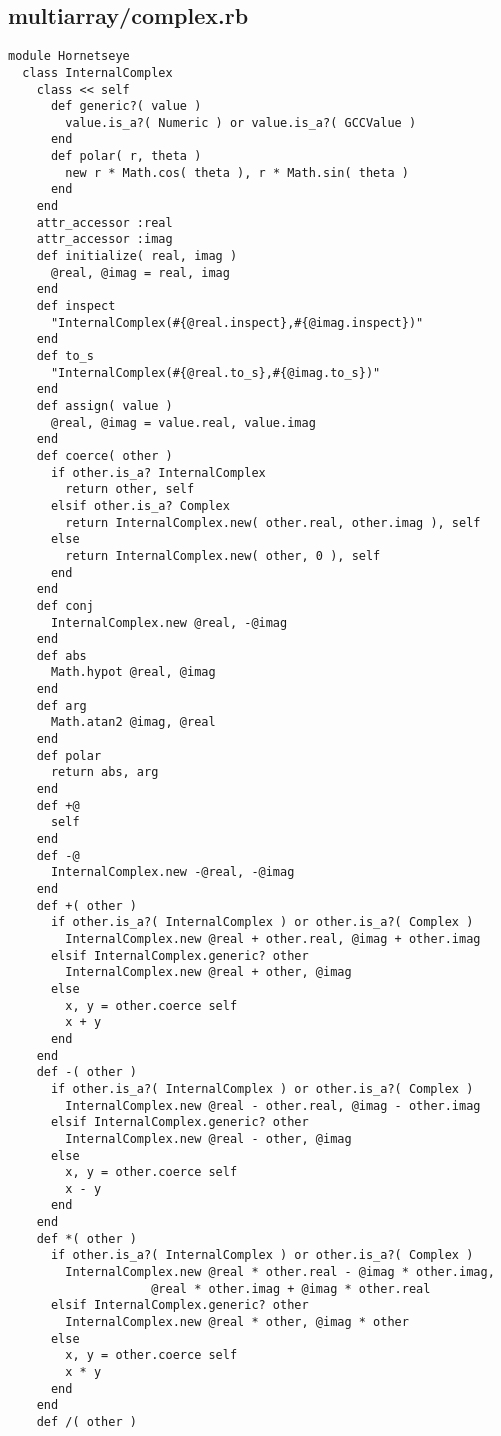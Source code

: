 \subsection{multiarray/complex.rb}\label{cha:multiarray-complex-rb}
\begin{lstlisting}
module Hornetseye
  class InternalComplex
    class << self
      def generic?( value )
        value.is_a?( Numeric ) or value.is_a?( GCCValue )
      end
      def polar( r, theta )
        new r * Math.cos( theta ), r * Math.sin( theta )
      end
    end
    attr_accessor :real
    attr_accessor :imag
    def initialize( real, imag )
      @real, @imag = real, imag
    end
    def inspect
      "InternalComplex(#{@real.inspect},#{@imag.inspect})"
    end
    def to_s
      "InternalComplex(#{@real.to_s},#{@imag.to_s})"
    end
    def assign( value )
      @real, @imag = value.real, value.imag
    end
    def coerce( other )
      if other.is_a? InternalComplex
        return other, self
      elsif other.is_a? Complex
        return InternalComplex.new( other.real, other.imag ), self
      else
        return InternalComplex.new( other, 0 ), self
      end
    end
    def conj
      InternalComplex.new @real, -@imag
    end
    def abs
      Math.hypot @real, @imag
    end
    def arg
      Math.atan2 @imag, @real
    end
    def polar
      return abs, arg
    end
    def +@
      self
    end
    def -@
      InternalComplex.new -@real, -@imag
    end
    def +( other )
      if other.is_a?( InternalComplex ) or other.is_a?( Complex )
        InternalComplex.new @real + other.real, @imag + other.imag
      elsif InternalComplex.generic? other
        InternalComplex.new @real + other, @imag
      else
        x, y = other.coerce self
        x + y
      end
    end
    def -( other )
      if other.is_a?( InternalComplex ) or other.is_a?( Complex )
        InternalComplex.new @real - other.real, @imag - other.imag
      elsif InternalComplex.generic? other
        InternalComplex.new @real - other, @imag
      else
        x, y = other.coerce self
        x - y
      end
    end
    def *( other )
      if other.is_a?( InternalComplex ) or other.is_a?( Complex )
        InternalComplex.new @real * other.real - @imag * other.imag,
                    @real * other.imag + @imag * other.real
      elsif InternalComplex.generic? other
        InternalComplex.new @real * other, @imag * other
      else
        x, y = other.coerce self
        x * y
      end
    end
    def /( other )

\end{lstlisting}
